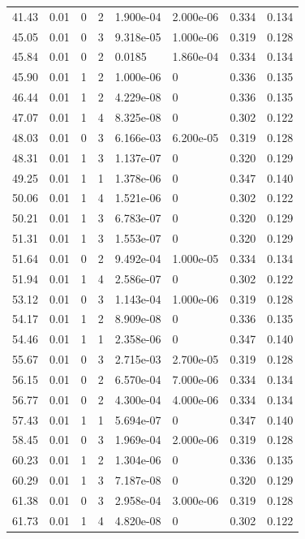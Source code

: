 \documentclass[preview]{standalone}
\begin{document}
{{{\begin{tabular}{L{1.2cm}C{1.2cm} C{0.3cm}C{0.5cm} C{1.4cm}C{1.4cm} C{1.4cm}C{1.4cm}}
  41.43  &  0.01  & 0     &  2 &  1.900e-04  & 2.000e-06  & 0.334 &  0.134   \\ 
  45.05  &  0.01  & 0     &  3 &  9.318e-05  & 1.000e-06  & 0.319 &  0.128   \\ 
  45.84  &  0.01  & 0     &  2 &  0.0185  & 1.860e-04  & 0.334 &  0.134   \\ 
  45.90  &  0.01  & 1     &  2 &  1.000e-06  & 0  & 0.336 &  0.135   \\ 
  46.44  &  0.01  & 1     &  2 &  4.229e-08  & 0  & 0.336 &  0.135   \\ 
  47.07  &  0.01  & 1     &  4 &  8.325e-08  & 0  & 0.302 &  0.122   \\ 
  48.03  &  0.01  & 0     &  3 &  6.166e-03  & 6.200e-05  & 0.319 &  0.128   \\ 
  48.31  &  0.01  & 1     &  3 &  1.137e-07  & 0  & 0.320 &  0.129   \\ 
  49.25  &  0.01  & 1     &  1 &  1.378e-06  & 0  & 0.347 &  0.140   \\ 
  50.06  &  0.01  & 1     &  4 &  1.521e-06  & 0  & 0.302 &  0.122   \\ 
  50.21  &  0.01  & 1     &  3 &  6.783e-07  & 0  & 0.320 &  0.129   \\ 
  51.31  &  0.01  & 1     &  3 &  1.553e-07  & 0  & 0.320 &  0.129   \\ 
  51.64  &  0.01  & 0     &  2 &  9.492e-04  & 1.000e-05  & 0.334 &  0.134   \\ 
  51.94  &  0.01  & 1     &  4 &  2.586e-07  & 0  & 0.302 &  0.122   \\ 
  53.12  &  0.01  & 0     &  3 &  1.143e-04  & 1.000e-06  & 0.319 &  0.128   \\ 
  54.17  &  0.01  & 1     &  2 &  8.909e-08  & 0  & 0.336 &  0.135   \\ 
  54.46  &  0.01  & 1     &  1 &  2.358e-06  & 0  & 0.347 &  0.140   \\ 
  55.67  &  0.01  & 0     &  3 &  2.715e-03  & 2.700e-05  & 0.319 &  0.128   \\ 
  56.15  &  0.01  & 0     &  2 &  6.570e-04  & 7.000e-06  & 0.334 &  0.134   \\ 
  56.77  &  0.01  & 0     &  2 &  4.300e-04  & 4.000e-06  & 0.334 &  0.134   \\ 
  57.43  &  0.01  & 1     &  1 &  5.694e-07  & 0  & 0.347 &  0.140   \\ 
  58.45  &  0.01  & 0     &  3 &  1.969e-04  & 2.000e-06  & 0.319 &  0.128   \\ 
  60.23  &  0.01  & 1     &  2 &  1.304e-06  & 0  & 0.336 &  0.135   \\ 
  60.29  &  0.01  & 1     &  3 &  7.187e-08  & 0  & 0.320 &  0.129   \\ 
  61.38  &  0.01  & 0     &  3 &  2.958e-04  & 3.000e-06  & 0.319 &  0.128   \\ 
  61.73  &  0.01  & 1     &  4 &  4.820e-08  & 0  & 0.302 &  0.122   \\ 
\hline 
\end{tabular} 

}}}
\end{document}
